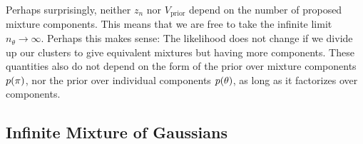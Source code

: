 Perhaps surprisingly, neither $z_n$ nor $V_{\textrm{prior}}$ depend on the number of proposed mixture components.  This means that we are free to take the infinite limit $n_\theta \rightarrow \infty$.
%
Perhaps this makes sense:  The likelihood does not change if we divide up our clusters to give equivalent mixtures but having more components.  
%
These quantities also do not depend on the form of the prior over mixture components $p( {\bf{\pi}} )$, nor the prior over individual components $p( {\bf{\theta}} )$, as long as it factorizes over components.
%


\subsection{Infinite Mixture of Gaussians}

